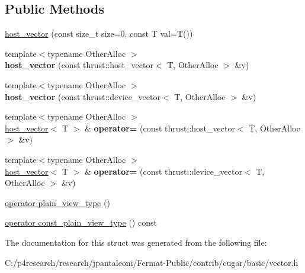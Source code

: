 \subsection*{Public Methods}
\begin{DoxyCompactItemize}
\item 
\hyperlink{group___basic_gaada99b7771790a67817b7280b75d8b19}{host\+\_\+vector} (const size\+\_\+t size=0, const T val=T())
\item 
{\footnotesize template$<$typename Other\+Alloc $>$ }\\{\bfseries host\+\_\+vector} (const thrust\+::host\+\_\+vector$<$ T, Other\+Alloc $>$ \&v)
\item 
{\footnotesize template$<$typename Other\+Alloc $>$ }\\{\bfseries host\+\_\+vector} (const thrust\+::device\+\_\+vector$<$ T, Other\+Alloc $>$ \&v)
\item 
{\footnotesize template$<$typename Other\+Alloc $>$ }\\\hyperlink{structcugar_1_1host__vector}{host\+\_\+vector}$<$ T $>$ \& {\bfseries operator=} (const thrust\+::host\+\_\+vector$<$ T, Other\+Alloc $>$ \&v)
\item 
{\footnotesize template$<$typename Other\+Alloc $>$ }\\\hyperlink{structcugar_1_1host__vector}{host\+\_\+vector}$<$ T $>$ \& {\bfseries operator=} (const thrust\+::device\+\_\+vector$<$ T, Other\+Alloc $>$ \&v)
\item 
\hyperlink{group___basic_gafa4904073d10ce73dc33dfb69013b501}{operator plain\+\_\+view\+\_\+type} ()
\item 
\hyperlink{group___basic_ga4b49363d011f3360acad5d64fad398cb}{operator const\+\_\+plain\+\_\+view\+\_\+type} () const
\end{DoxyCompactItemize}


The documentation for this struct was generated from the following file\+:\begin{DoxyCompactItemize}
\item 
C\+:/p4research/research/jpantaleoni/\+Fermat-\/\+Public/contrib/cugar/basic/vector.\+h\end{DoxyCompactItemize}
